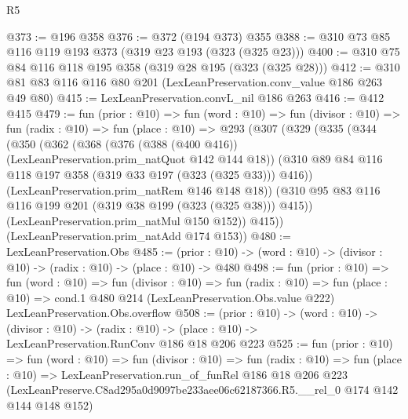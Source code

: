 \begin{lexlean}{R5}
\begin{coremodule}
@373 := @196 @358
@376 := @372 (@194 @373) @355
@388 := @310 @73 @85 @116 @119 @193 @373 (@319 @23 @193 (@323 (@325 @23)))
@400 := @310 @75 @84 @116 @118 @195 @358 (@319 @28 @195 (@323 (@325 @28)))
@412 := @310 @81 @83 @116 @116 @80 @201 (LexLeanPreservation.conv_value @186 @263 @49 @80)
@415 := LexLeanPreservation.convL_nil @186 @263
@416 := @412 @415
@479 := fun (prior : @10) =>
  fun (word : @10) =>
  fun (divisor : @10) =>
  fun (radix : @10) =>
  fun (place : @10) =>
  @293
    (@307
      (@329
        (@335
          (@344
            (@350
              (@362
                (@368
                  (@376 (@388 (@400 @416)) (LexLeanPreservation.prim_natQuot @142 @144 @18))
                  (@310 @89 @84 @116 @118 @197 @358 (@319 @33 @197 (@323 (@325 @33))) @416))
                (LexLeanPreservation.prim_natRem @146 @148 @18))
              (@310 @95 @83 @116 @116 @199 @201 (@319 @38 @199 (@323 (@325 @38))) @415))
            (LexLeanPreservation.prim_natMul @150 @152))
          @415))
      (LexLeanPreservation.prim_natAdd @174 @153))
@480 := LexLeanPreservation.Obs
@485 := (prior : @10) -> (word : @10) -> (divisor : @10) -> (radix : @10) -> (place : @10) -> @480
@498 := fun (prior : @10) =>
  fun (word : @10) =>
  fun (divisor : @10) =>
  fun (radix : @10) =>
  fun (place : @10) =>
  cond.{1} @480 @214 (LexLeanPreservation.Obs.value @222) LexLeanPreservation.Obs.overflow
@508 := (prior : @10) ->
  (word : @10) ->
  (divisor : @10) ->
  (radix : @10) -> (place : @10) -> LexLeanPreservation.RunConv @186 @18 @206 @223
@525 := fun (prior : @10) =>
  fun (word : @10) =>
  fun (divisor : @10) =>
  fun (radix : @10) =>
  fun (place : @10) =>
  LexLeanPreservation.run_of_funRel
    @186
    @18
    @206
    @223
    (LexLeanPreserve.C8ad295a0d9097be233aee06c62187366.R5.__rel_0 @174 @142 @144 @148 @152)
\end{coremodule}
\end{lexlean}
